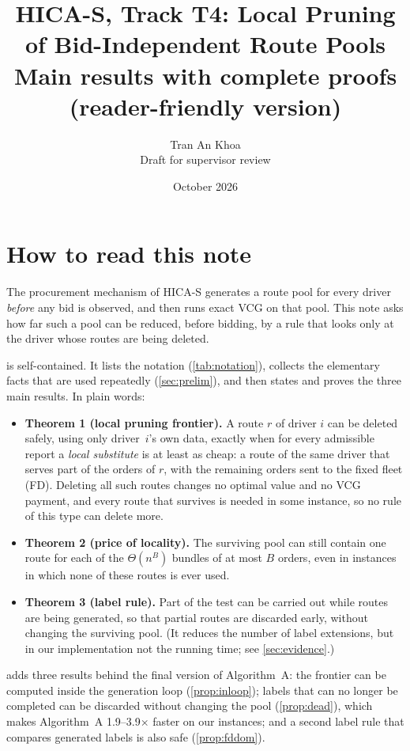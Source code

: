 \documentclass[11pt]{article}
\title{HICA-S, Track T4: Local Pruning of Bid-Independent Route Pools\\[3pt]
\large Main results with complete proofs (reader-friendly version)}
\author{Tran An Khoa\\ \small Draft for supervisor review}
\date{October 2026}
\theoremstyle{definition}
\theoremstyle{remark}
\begin{document}
\maketitle

\section*{How to read this note}

The procurement mechanism of HICA-S generates a route pool for every driver
\emph{before} any bid is observed, and then runs exact VCG on that pool. This
note asks how far such a pool can be reduced, before bidding, by a rule that
looks only at the driver whose routes are being deleted.

 is self-contained. It lists the notation (\cref{tab:notation}),
collects the elementary facts that are used repeatedly (\cref{sec:prelim}), and
then states and proves the three main results. In plain words:

\begin{itemize}[leftmargin=1.4em, itemsep=2pt]
\item \textbf{Theorem 1 (local pruning frontier).} A route $r$ of driver $i$
can be deleted safely, using only driver~$i$'s own data, exactly when for every
admissible report a \emph{local substitute} is at least as cheap: a route of
the same driver that serves part of the orders of $r$, with the remaining
orders sent to the fixed fleet (FD). Deleting all such routes changes no
optimal value and no VCG payment, and every route that survives is needed in
some instance, so no rule of this type can delete more.
\item \textbf{Theorem 2 (price of locality).} The surviving pool can still
contain one route for each of the $\Theta(n^B)$ bundles of at most $B$ orders,
even in instances in which none of these routes is ever used.
\item \textbf{Theorem 3 (label rule).} Part of the test can be carried out
while routes are being generated, so that partial routes are discarded early,
without changing the surviving pool. (It reduces the number of label
extensions, but in our implementation not the running time; see
\cref{sec:evidence}.)
\end{itemize}
 adds three results behind the final version of
Algorithm~A: the frontier can be computed inside the generation loop
(\cref{prop:inloop}); labels that can no longer be completed can be discarded
without changing the pool (\cref{prop:dead}), which makes Algorithm~A
1.9--3.9$\times$ faster on our instances; and a second label rule that compares
generated labels is also safe (\cref{prop:fddom}).
\end{document}
